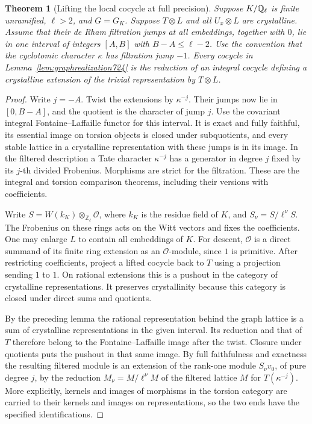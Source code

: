 \documentclass[a4paper,11pt]{article}
\newtheorem{theorem}[proposition]{Theorem}
\theoremstyle{definition}
\theoremstyle{remark}
\newcommand{\ZZ}{\mathbb Z}\newcommand{\ord}{\operatorname{ord}}
\numberwithin{equation}{section}
\begin{document}
\begin{theorem}[Lifting the local cocycle at full precision]\leavevmode
\label{thm:fllift724}
Suppose \(K/\mathbb Q_\ell\) is finite unramified, \(\ell>2\), and \(G=G_K\).
Suppose \(T\otimes L\) and all \(U_x\otimes L\) are crystalline. Assume
that their de Rham filtration jumps at all embeddings, together with \(0\),
lie in one interval of integers \([A,B]\) with \(B-A\le\ell-2\).
Use the convention that the cyclotomic character \(\kappa\) has
filtration jump \(-1\). Every cocycle in Lemma~\ref{lem:graphrealization724}
is the reduction of an integral cocycle defining a crystalline extension
of the trivial representation by \(T\otimes L\).
\end{theorem}
\begin{proof}
Write \(j=-A\). Twist the extensions by \(\kappa^{-j}\). Their jumps
now lie in \([0,B-A]\), and the quotient is the character of jump \(j\).
Use the covariant integral Fontaine--Laffaille functor for this interval.
It is exact and fully faithful, its essential image on torsion objects
is closed under subquotients, and every stable lattice in a crystalline
representation with these jumps is in its image. In the filtered
description a Tate character \(\kappa^{-j}\) has a generator in degree
\(j\) fixed by its \(j\)-th divided Frobenius. Morphisms are strict for
the filtration. These are the integral and torsion comparison theorems,
including their versions with coefficients.
~\cite{II-II-II-fl724,II-II-II-ghls724}

Write \(S=W(k_K)\otimes_{\ZZ_\ell}\mathcal O\), where \(k_K\) is the
residue field of \(K\), and \(S_\nu=S/\ell^\nu S\). The Frobenius on
these rings acts on the Witt vectors and fixes the coefficients. One
may enlarge \(L\) to contain all embeddings of \(K\). For descent,
\(\mathcal O\) is a direct summand of its finite ring extension as an
\(\mathcal O\)-module, since \(1\) is primitive. After restricting
coefficients, project a lifted cocycle back to \(T\) using a projection
sending \(1\) to \(1\). On rational extensions this is a pushout in the
category of crystalline representations. It preserves crystallinity
because this category is closed under direct sums and quotients.

By the preceding lemma the rational representation behind the graph
lattice is a sum of crystalline representations in the given interval.
Its reduction and that of \(T\) therefore belong to the Fontaine--Laffaille
image after the twist. Closure under quotients puts the pushout in that
same image. By full faithfulness and exactness the resulting filtered
module is an extension of the rank-one module \(S_\nu v_0\), of pure
degree \(j\), by the reduction \(M_\nu=M/\ell^\nu M\) of the filtered
lattice \(M\) for \(T(\kappa^{-j})\). More explicitly, kernels and images
of morphisms in the torsion category are carried to their kernels and
images on representations, so the two ends have the specified
identifications.


\end{proof}
\end{document}
